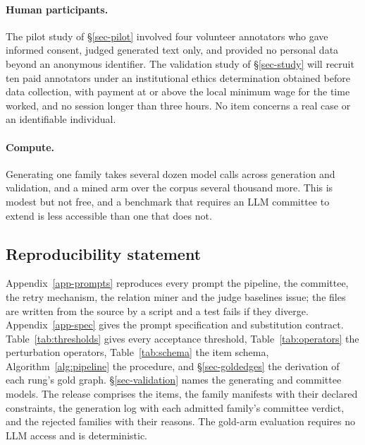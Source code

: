 \paragraph{Human participants.} The pilot study of \S\ref{sec-pilot} involved four volunteer annotators who gave informed
consent, judged generated text only, and provided no personal data beyond an anonymous identifier. The validation
study of \S\ref{sec-study} will recruit ten paid annotators under an institutional ethics determination obtained
before data collection, with payment at or above the local minimum wage for the time worked, and no session longer
than three hours. No item concerns a real case
or an identifiable individual.

\paragraph{Compute.} Generating one family takes several dozen model calls across generation and validation, and a
mined arm over the corpus several thousand more. This is modest but not free, and a benchmark that requires an LLM
committee to extend is less accessible than one that does not.

\subsection*{Reproducibility statement}

Appendix~\ref{app-prompts} reproduces every prompt the pipeline, the committee, the retry mechanism, the relation miner
and the judge baselines issue; the files are written from the source by a script and a test fails if they diverge.
Appendix~\ref{app-spec} gives the prompt specification and substitution contract. Table~\ref{tab:thresholds} gives
every acceptance threshold, Table~\ref{tab:operators} the perturbation operators, Table~\ref{tab:schema} the item
schema, Algorithm~\ref{alg:pipeline} the procedure, and \S\ref{sec-goldedges} the derivation of each rung's gold graph.
\S\ref{sec-validation} names the generating and committee models. The release comprises the items, the family manifests
with their declared constraints, the generation log with each admitted family's committee verdict, and the rejected
families with their reasons. The gold-arm evaluation requires no LLM access and is deterministic.




\appendix

